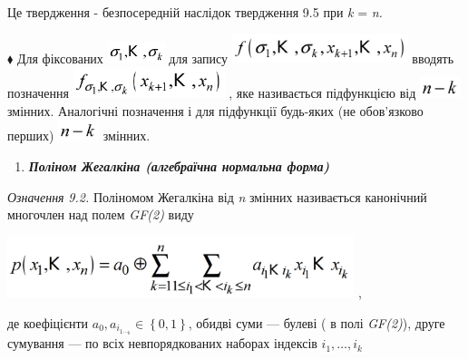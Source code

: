  Це твердження  {}- безпосередній наслідок твердження  9.5\textit{  }при 
\textit{k}\textit{ }=\textit{ }\textit{n}\textit{.}

$\blacklozenge$ Для фіксованих 
\includegraphics[width=0.6571in,height=0.248in]{crypt-img/crypt-img113.png} 
для запису 
\includegraphics[width=2.0201in,height=0.3346in]{crypt-img/crypt-img114.png} 
вводять позначення 
\includegraphics[width=1.7398in,height=0.3535in]{crypt-img/crypt-img115.png} , 
яке називається підфункцією від  
\includegraphics[width=0.4681in,height=0.2409in]{crypt-img/crypt-img116.png} 
змінних. Аналогічні позначення і для підфункції будь-яких (не обов’язково
перших) 
\includegraphics[width=0.4681in,height=0.2409in]{crypt-img/crypt-img117.png}
змінних. 


\bigskip

\liststyleWWviiiNumlii
\begin{enumerate}
\item {\bfseries\itshape
Поліном Жегалкіна (алгебраїчна  нормальна форма)}
\end{enumerate}
 \textit{Означення }\textit{9.}\textit{2.}\textit{  }Поліномом Жегалкіна від
\textit{n} змінних називається канонічний многочлен над полем \textit{GF(2)
}\textit{ }виду

{\centering
 \includegraphics[width=3.9835in,height=0.7in]{crypt-img/crypt-img118.png} , 
\par}

де коефіцієнти   ${a_{0},a_{i_{{1}\dotsi_{k}}}\in
\left\{ 0,1 \right\}}$, обидві суми --- булеві ( в полі \textit{GF(2)}), друге
сумування --- по всіх невпорядкованих наборах  індексів 
$i_{1},\dots,i_k$\textit{ }\textit{ }

